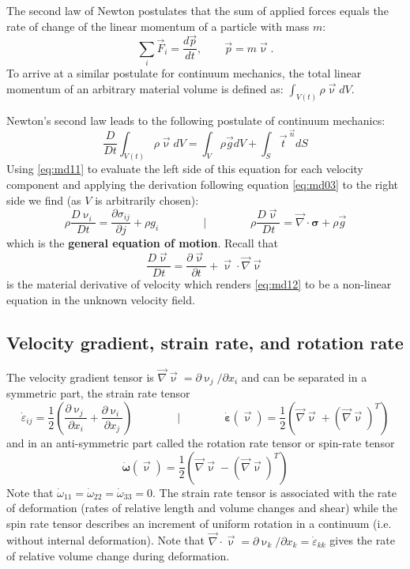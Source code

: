 The second law of Newton postulates that the sum of applied forces equals the rate of
change of the linear momentum of a particle with mass $m$:
\[
\sum_i \vec{F}_i = \frac{d\vec{p}}{dt},
\qquad
\vec{p}=m \vec{\upnu}.
\]
To arrive at a similar postulate for continuum mechanics, the total linear momentum of
an arbitrary material volume is defined as: $\int_{V(t)}\rho \vec{\upnu} dV$.

Newton’s second law leads to the following postulate of continuum mechanics:
\[
\frac{D}{Dt} \int_{V(t)} \rho \vec\upnu dV
=
\int_{V} \rho \vec{g} dV + \int_S \vec{t}^{\; \vec{n}} dS
\]
Using \eqref{eq:md11} to evaluate the left side of this equation 
for each velocity component and
applying the derivation following equation 
\eqref{eq:md03}
to the 
right side we find (as $V$ is arbitrarily chosen):
\begin{equation}
\rho\frac{D \upnu_i}{Dt} = \frac{\partial \sigma_{ij}}{\partial j} + \rho {g}_i
\qquad
\qquad
\bigg\rvert
\qquad
\qquad
\rho \frac{D\vec\upnu}{Dt} = \vec\nabla\cdot {\bm \sigma} + \rho \vec{g}
\label{eq:md12}
\end{equation}
which is the {\bf general equation of motion}.
Recall that
\[
\frac{D\vec\upnu}{Dt} = \frac{\partial \vec\upnu}{\partial t}
+
\vec \upnu \cdot \vec\nabla \vec\upnu
\]
is the material derivative of velocity which renders \eqref{eq:md12} to
be a non-linear equation in the unknown velocity field.

\subsection{Velocity gradient, strain rate, and rotation rate}
The velocity gradient tensor is $\vec\nabla\vec\upnu = \partial \upnu_j/\partial x_i$
and can be separated in a symmetric part, the strain rate tensor 
\[
\dot\varepsilon_{ij}=\frac12 \left(
\frac{\partial \upnu_j}{\partial x_i}
+ 
\frac{\partial \upnu_i}{\partial x_j}
\right)
\qquad
\qquad
\bigg\rvert
\qquad
\qquad
\dot{\bm \varepsilon}(\vec\upnu) = \frac12 \left(  
\vec\nabla\vec\upnu + (\vec\nabla\vec\upnu)^T \right)
\]
and in an anti-symmetric part called the rotation
rate tensor or spin-rate tensor
\[
\dot{\bm\omega} (\vec\upnu)=  \frac12 \left(  
\vec\nabla\vec\upnu - (\vec\nabla\vec\upnu)^T \right) 
\]
Note that $\dot\omega_{11}=\dot\omega_{22}=\dot\omega_{33}=0$.
The strain rate tensor is associated with the rate of
deformation (rates of relative length and volume changes and shear) 
while the spin rate
tensor describes an increment of uniform rotation in a continuum 
(i.e. without internal deformation). 
Note that  $\vec\nabla\cdot\vec\upnu= \partial \upnu_k/\partial x_k = 
\dot\varepsilon_{kk}$ gives the rate of relative volume change
during deformation.


